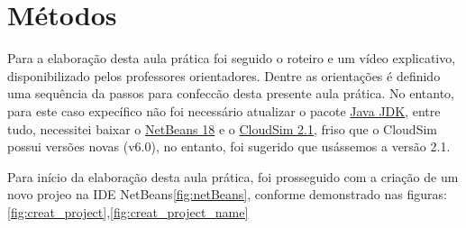 \section{Métodos}
\par Para a elaboração desta aula prática foi seguido o roteiro e um vídeo explicativo, disponibilizado pelos professores orientadores. Dentre as orientações é definido uma sequência da passos para  confeccão desta presente aula prática. No entanto, para este caso expecífico não foi necessário atualizar o pacote \href{https://www.oracle.com/java/technologies/downloads/}{Java JDK}, entre tudo, necessitei baixar o \href{https://netbeans.apache.org/download/nb19/}{NetBeans 18} e o \href{https://github.com/Cloudslab/cloudsim/releases}{CloudSim 2.1}, friso que o CloudSim possui versões novas (v6.0), no entanto, foi sugerido que usássemos a versão 2.1.

\par Para início da elaboração desta aula prática, foi prosseguido com a criação de um novo projeo na IDE NetBeans\ref{fig:netBeans}, conforme demonstrado nas figuras:\ref{fig:creat_project},\ref{fig:creat_project_name}

